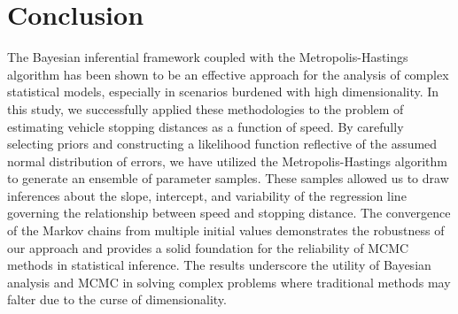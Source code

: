 \section{Conclusion}
The Bayesian inferential framework coupled with the Metropolis-Hastings algorithm has been shown to be an effective approach for the analysis of complex statistical models, especially in scenarios burdened with high dimensionality. In this study, we successfully applied these methodologies to the problem of estimating vehicle stopping distances as a function of speed. By carefully selecting priors and constructing a likelihood function reflective of the assumed normal distribution of errors, we have utilized the Metropolis-Hastings algorithm to generate an ensemble of parameter samples. These samples allowed us to draw inferences about the slope, intercept, and variability of the regression line governing the relationship between speed and stopping distance. The convergence of the Markov chains from multiple initial values demonstrates the robustness of our approach and provides a solid foundation for the reliability of MCMC methods in statistical inference. The results underscore the utility of Bayesian analysis and MCMC in solving complex problems where traditional methods may falter due to the curse of dimensionality.
